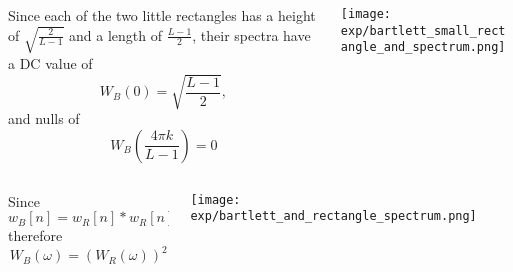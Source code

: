\documentclass{beamer}
\begin{document}
\begin{frame}
  \begin{columns}
    \begin{column}{0.5\textwidth}
 
      Since each of the two little rectangles has a height of
      $\sqrt{\frac{2}{L-1}}$ and a length of $\frac{L-1}{2}$, their
      spectra have a DC value of
      \begin{displaymath}
        W_B(0) = \sqrt{\frac{L-1}{2}},
      \end{displaymath}
      and nulls of
      \begin{displaymath}
        W_B\left(\frac{4\pi k}{L-1}\right) = 0
      \end{displaymath}
    \end{column}
    \begin{column}{0.5\textwidth}
      \begin{center}
        \texttt{[image: exp/bartlett\_small\_rectangle\_and\_spectrum.png]}
      \end{center}
    \end{column}
  \end{columns}
\end{frame}


\begin{frame}
  \begin{columns}
    \begin{column}{0.5\textwidth}
 
      Since
      \begin{displaymath}
        w_B[n] = w_R[n]\ast w_R[n],
      \end{displaymath}
      therefore
      \begin{displaymath}
        W_B(\omega) = \left(W_R(\omega)\right)^2
      \end{displaymath}
    \end{column}
    \begin{column}{0.5\textwidth}
      \begin{center}
        \texttt{[image: exp/bartlett\_and\_rectangle\_spectrum.png]}
      \end{center}
    \end{column}
  \end{columns}
\end{frame}
\end{document}
